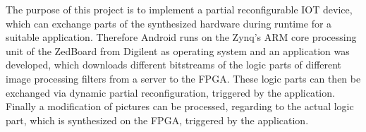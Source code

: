 The purpose of this project is to implement a partial reconfigurable IOT device, which can exchange parts of the synthesized hardware during runtime for a suitable application. Therefore Android runs on the Zynq's ARM core processing unit of the ZedBoard from Digilent as operating system and an application was developed, which downloads different bitstreams of the logic parts of different image processing filters from a server to the FPGA. These logic parts can then be exchanged via dynamic partial reconfiguration, triggered by the application. Finally a modification of pictures can be processed, regarding to the actual logic part, which is synthesized on the FPGA, triggered by the application.
